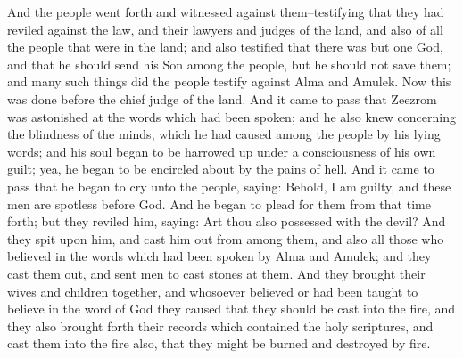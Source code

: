 And the people went forth and witnessed against them--testifying that they had reviled against the law, and their lawyers and judges of the land, and also of all the people that were in the land; and also testified that there was but one God, and that he should send his Son among the people, but he should not save them; and many such things did the people testify against Alma and Amulek. Now this was done before the chief judge of the land.
\bverse \iffalse And it came to pass that Zeezrom was astonished at the words which had been spoken; and he also knew concerning the blindness of the minds, which he had caused among the people by his lying words; and his soul began to be harrowed up under a consciousness of his own guilt; yea, he began to be encircled about by the pains of hell. \fi
And it came to pass that Zeezrom was astonished at the words which had been spoken; and he also knew concerning the blindness of the minds, which he had caused among the people by his lying words; and his soul began to be harrowed up under a consciousness of his own guilt; yea, he began to be encircled about by the pains of hell.
\bverse \iffalse And it came to pass that he began to cry unto the people, saying: Behold, I am guilty, and these men are spotless before God. And he began to plead for them from that time forth; but they reviled him, saying: Art thou also possessed with the devil?  And they spit upon him, and cast him out from among them, and also all those who believed in the words which had been spoken by Alma and Amulek; and they cast them out, and sent men to cast stones at them. \fi
And it came to pass that he began to cry unto the people, saying: Behold, I am guilty, and these men are spotless before God. And he began to plead for them from that time forth; but they reviled him, saying: Art thou also possessed with the devil?  And they spit upon him, and cast him out from among them, and also all those who believed in the words which had been spoken by Alma and Amulek; and they cast them out, and sent men to cast stones at them.
\bverse \iffalse And they brought their wives and children together, and whosoever believed or had been taught to believe in the word of God they caused that they should be cast into the fire, and they also brought forth their records which contained the holy scriptures, and cast them into the fire also, that they might be burned and destroyed by fire. \fi
And they brought their wives and children together, and whosoever believed or had been taught to believe in the word of God they caused that they should be cast into the fire, and they also brought forth their records which contained the holy scriptures, and cast them into the fire also, that they might be burned and destroyed by fire.
